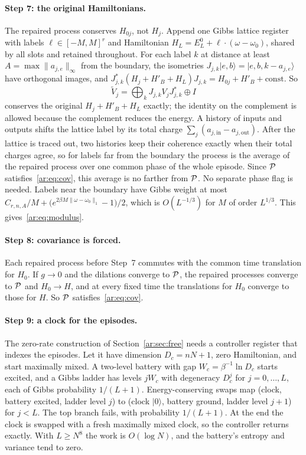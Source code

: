 \paragraph{Step 7: the original Hamiltonians.} The repaired process conserves $H_{0j}$, not $H_j$. Append one Gibbs lattice register with labels $\ell\in[-M,M]^r$ and Hamiltonian $H_L=E_L^0+\ell\cdot(\omega-\omega_0)$, shared by all slots and retained throughout. For each label $k$ at distance at least $A=\max\|a_{j,e}\|_\infty$ from the boundary, the isometries $J_{j,k}|e,b\rangle=|e,b,k-a_{j,e}\rangle$ have orthogonal images, and $J_{j,k}^*(H_j+H'_B+H_L)J_{j,k}=H_{0j}+H'_B+\mathrm{const}$. So
\[
\widetilde V_j=\bigoplus_kJ_{j,k}V_jJ_{j,k}^*\oplus I
\]
conserves the original $H_j+H'_B+H_L$ exactly; the identity on the complement is allowed because the complement reduces the energy. A history of inputs and outputs shifts the lattice label by its total charge $\sum_j(a_{j,\mathrm{in}}-a_{j,\mathrm{out}})$. After the lattice is traced out, two histories keep their coherence exactly when their total charges agree, so for labels far from the boundary the process is the average of the repaired process over one common phase of the whole episode. Since $\mathcal P$ satisfies~\eqref{ar:eq:cov}, this average is no farther from $\mathcal P$. No separate phase flag is needed. Labels near the boundary have Gibbs weight at most $C_{r,n,A}/M+\bigl(e^{2\beta M\|\omega-\omega_0\|_1}-1\bigr)/2$, which is $O(L^{-1/3})$ for $M$ of order $L^{1/3}$. This gives~\eqref{ar:eq:modulus}.

\paragraph{Step 8: covariance is forced.} Each repaired process before Step~7 commutes with the common time translation for $H_0$. If $g\to0$ and the dilations converge to $\mathcal P$, the repaired processes converge to $\mathcal P$ and $H_0\to H$, and at every fixed time the translations for $H_0$ converge to those for $H$. So $\mathcal P$ satisfies~\eqref{ar:eq:cov}.

\paragraph{Step 9: a clock for the episodes.} The zero-rate construction of Section~\ref{ar:sec:free} needs a controller register that indexes the episodes. Let it have dimension $D_c=nN+1$, zero Hamiltonian, and start maximally mixed. A two-level battery with gap $W_c=\beta^{-1}\ln D_c$ starts excited, and a Gibbs ladder has levels $jW_c$ with degeneracy $D_c^j$ for $j=0,\dots,L$, each of Gibbs probability $1/(L+1)$. Energy-conserving swaps map (clock, battery excited, ladder level $j$) to (clock $|0\rangle$, battery ground, ladder level $j+1$) for $j<L$. The top branch fails, with probability $1/(L+1)$. At the end the clock is swapped with a fresh maximally mixed clock, so the controller returns exactly. With $L\ge N^8$ the work is $O(\log N)$, and the battery's entropy and variance tend to zero.

